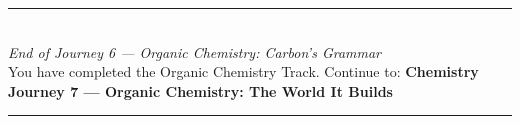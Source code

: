 \documentclass[12pt, a4paper]{book}
\begin{document}
\vspace{1.4cm}
\begin{center}
{\color{JourneyColor}\rule{0.5\linewidth}{0.8pt}}\\[6pt]
{\small\color{JourneyColor}\textit{End of Journey 6 --- Organic Chemistry: Carbon's Grammar}}\\[4pt]
{\small\color{JourneyColor}You have completed the Organic Chemistry Track. Continue to: \textbf{Chemistry Journey 7 --- Organic Chemistry: The World It Builds}}\\[6pt]
{\color{JourneyColor}\rule{0.5\linewidth}{0.8pt}}
\end{center}
\end{document}
